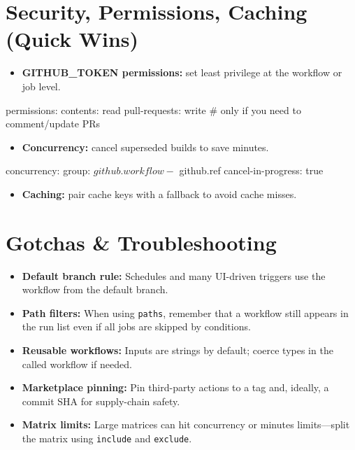 \documentclass[11pt]{article}
\begin{document}
\section{Security, Permissions, Caching (Quick Wins)}
\begin{itemize}
  \item \textbf{GITHUB\_TOKEN permissions:} set least privilege at the workflow or job level.
\end{itemize}

\begin{yamlcode}
permissions:
  contents: read
  pull-requests: write  # only if you need to comment/update PRs
\end{yamlcode}

\begin{itemize}
  \item \textbf{Concurrency:} cancel superseded builds to save minutes.
\end{itemize}

\begin{yamlcode}
concurrency:
  group: ${{ github.workflow }}-${{ github.ref }}
  cancel-in-progress: true
\end{yamlcode}

\begin{itemize}
  \item \textbf{Caching:} pair cache keys with a fallback to avoid cache misses.
\end{itemize}


\section{Gotchas \& Troubleshooting}
\begin{itemize}
  \item \textbf{Default branch rule:} Schedules and many UI-driven triggers use the workflow from the default branch.
  \item \textbf{Path filters:} When using \texttt{paths}, remember that a workflow still appears in the run list even if all jobs are skipped by conditions.
  \item \textbf{Reusable workflows:} Inputs are strings by default; coerce types in the called workflow if needed.
  \item \textbf{Marketplace pinning:} Pin third-party actions to a tag and, ideally, a commit SHA for supply-chain safety.
  \item \textbf{Matrix limits:} Large matrices can hit concurrency or minutes limits—split the matrix using \texttt{include} and \texttt{exclude}.
\end{itemize}
\end{document}
